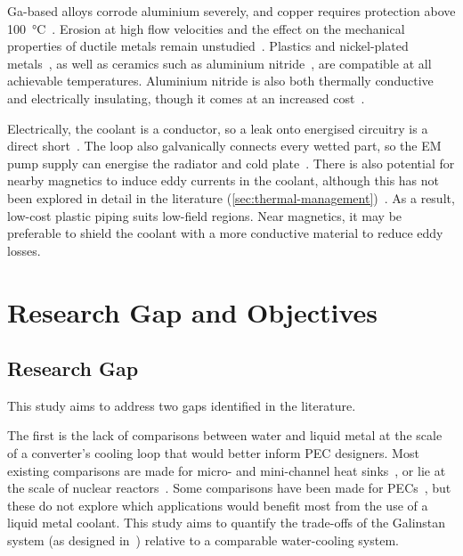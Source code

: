 Ga-based alloys corrode aluminium severely, and copper requires protection
above \SI{100}{\celsius}~\cite{an_liquid_2024}. Erosion at high flow velocities
and the effect on the mechanical properties of ductile metals remain unstudied~\cite{hodes_potential_2014}.
Plastics and nickel-plated metals~\cite{hodes_potential_2014}, as well as
ceramics such as aluminium nitride~\cite{an_liquid_2024}, are compatible at all achievable temperatures.
Aluminium nitride is also both thermally conductive and electrically
insulating, though it comes at an increased cost~\cite{gao_modeling_2022}.

Electrically, the coolant is a conductor, so a leak onto
energised circuitry is a direct short~\cite{hodes_potential_2014}. The loop also
galvanically connects every wetted part, so the EM pump supply can energise the
radiator and cold plate~\cite{kwon_project_2025}. There is also potential for nearby
magnetics to induce eddy currents in the coolant, although this has not been explored in detail in the literature
(\cref{sec:thermal-management})~\cite{an_liquid_2024, fan_ultra-efficient_2026}.
As a result, low-cost plastic piping suits low-field regions. 
Near magnetics, it may be preferable to shield the coolant with a more conductive material to reduce eddy losses.

\section{Research Gap and Objectives}
\label{sec:research-gap}

\subsection{Research Gap}
This study aims to address two gaps identified in the literature.

The first is the lack of comparisons between water and liquid metal at the scale
of a converter's cooling loop that would better inform PEC designers. 
Most existing comparisons are made for micro- and mini-channel heat
sinks~\cite{hodes_potential_2014,zhang_water-based_2015,zhang_experimental_2019,an_liquid_2024},
or lie at the scale of nuclear reactors~\cite{rowinski_small_2015}. Some
comparisons have been made for PECs~\cite{fan_ultra-efficient_2026}, but these
do not explore which applications would benefit most from the use of a liquid metal
coolant.
This study aims to quantify the trade-offs of the Galinstan system (as designed
in~\cite{kwon_project_2025,loh_project_2025}) relative to a comparable water-cooling
system.

